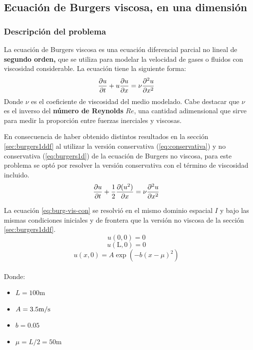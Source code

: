 \documentclass[12pt]{article}
\newcommand{\mpers}{\unit[per-mode = symbol]{\metre\per\second}}
\begin{document}
	\newpage
	\subsection{Ecuación de Burgers viscosa, en una dimensión}
	\label{sec:burg-vis1ddf}
	\subsubsection{Descripción del problema}
	La ecuación de Burgers viscosa es una ecuación diferencial parcial no lineal de \textbf{segundo orden,} que se utiliza para modelar la velocidad de gases o fluidos con viscosidad considerable. La ecuación tiene la siguiente forma:
	\begin{equation}
		\pdv{u}{t}+u\pdv{u}{x}=\nu \pdv{^2 u}{x^2}
		\label{eq:burg-vis}
	\end{equation}
	Donde $\nu$ es el coeficiente de viscosidad del medio modelado. Cabe destacar que $\nu$ es el inverso del \textbf{número de Reynolds} $Re$, una cantidad adimensional que sirve para medir la proporción entre fuerzas inerciales y viscosas. 

	En consecuencia de haber obtenido distintos resultados en la sección \ref{sec:burgers1ddf} al utilizar la versión conservativa (\ref{eq:conservativa}) y no conservativa (\ref{eq:burgers1d}) de la ecuación de Burgers no viscosa, para este problema se optó por resolver la versión conservativa con el término de viscosidad incluido.
	\begin{equation}
		\pdv{u}{t}+\frac{1}{2}\pdv{(u^2)}{x}=\nu \pdv{^2 u}{x^2}
		\label{eq:burg-vis-con}
	\end{equation}
	
 	La ecuación \ref{eq:burg-vis-con} se resolvió en el mismo dominio espacial $I$ y bajo las mismas condiciones iniciales y de frontera que la versión no viscosa de la sección \ref{sec:burgers1ddf}. 
 	\begin{equation}
 		u(0,0)=0
 	\end{equation}
 	\begin{equation}
 		u(\text{L},0)= 0
 	\end{equation}
	\begin{equation}
		u(x,0) = A\exp(-b(x-\mu)^{2})
		\label{eq:condinicial-vis}
	\end{equation}
	\\
	Donde:
	\begin{itemize}
		\item $L = 100\unit{\meter}$
		\item $A=3.5\mpers$
		\item $b=0.05$
		\item $\mu=L/2=50\unit{\meter}$
	\end{itemize}
	
\end{document}
